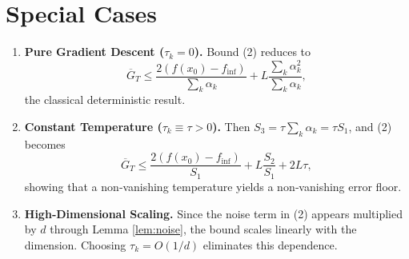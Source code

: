 \documentclass{article}
\begin{document}
\section*{Special Cases}
\begin{enumerate}
\item \textbf{Pure Gradient Descent ($\tau_{k}=0$).}
Bound (2) reduces to
\[
\overline{G}_{T}\le
\frac{2(f(x_{0})-f_{\inf})}{\sum_{k}\alpha_{k}}+
L\frac{\sum_{k}\alpha_{k}^{2}}{\sum_{k}\alpha_{k}},
\]
the classical deterministic result.
\item \textbf{Constant Temperature ($\tau_{k}\equiv\tau>0$).}
Then $S_{3}= \tau\sum_{k}\alpha_{k}= \tau S_{1}$, and (2) becomes
\[
\overline{G}_{T}\le
\frac{2(f(x_{0})-f_{\inf})}{S_{1}}+L\frac{S_{2}}{S_{1}}+2L\tau,
\]
showing that a non‑vanishing temperature yields a non‑vanishing error floor.
\item \textbf{High‑Dimensional Scaling.}
Since the noise term in (2) appears multiplied by $d$ through Lemma
\ref{lem:noise}, the bound scales linearly with the dimension. Choosing
$\tau_{k}=O(1/d)$ eliminates this dependence.
\end{enumerate}
\end{document}
